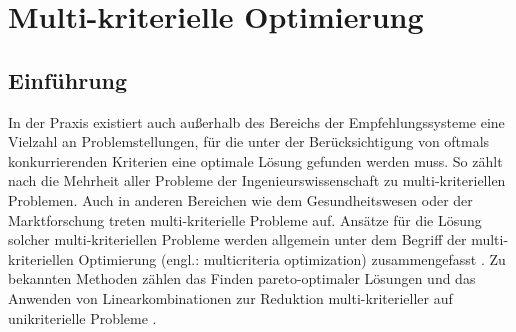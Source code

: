 
\chapter{Multi-kriterielle Optimierung}
\label{ch:erweiterungen}

\section{Einführung}
\label{ch:erweiterungen:einführung}

In der Praxis existiert auch außerhalb des Bereichs der Empfehlungssysteme eine Vielzahl an Problemstellungen, für die unter der Berücksichtigung von oftmals konkurrierenden Kriterien eine optimale Lösung gefunden werden muss.
So zählt nach \textcite[S. ix]{statnikov:book} die Mehrheit aller Probleme der Ingenieurswissenschaft zu multi-kriteriellen Problemen.
Auch in anderen Bereichen wie dem Gesundheitswesen \cite[S. 195]{nemeth:article} oder der Marktforschung \cite[S. 50]{adomavicius:inproceedings:2} treten multi-kriterielle Probleme auf.
Ansätze für die Lösung solcher multi-kriteriellen Probleme werden allgemein unter dem Begriff der multi-kriteriellen Optimierung (engl.: multicriteria optimization) zusammengefasst \cite[S. 867]{adomavicius:4:inbook}\cite[S. v]{ehrgott:book}.
Zu bekannten Methoden zählen das Finden pareto-optimaler Lösungen \cite[S. 50]{adomavicius:inproceedings:2} und das Anwenden von Linearkombinationen zur Reduktion multi-kriterieller auf unikriterielle Probleme \cite[S. 745]{adomavicius:inproceedings}.

